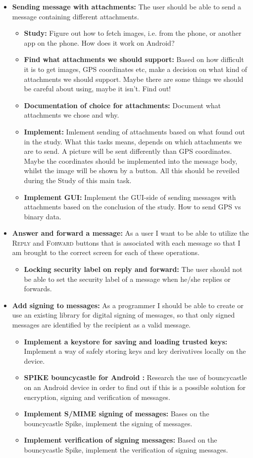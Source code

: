 \begin{itemize}
\item{}\textbf{Sending message with attachments:} The user should be able to send a message containing different attachments.
\begin{itemize}
\item{}\textbf{Study:} Figure out how to fetch images, i.e. from the phone, or another app on the phone. How does it work on Android?
\item{}\textbf{Find what attachments we should support:} Based on how difficult it is to get images, GPS coordinates etc, make a decision on what kind of attachments we should support. Maybe there are some things we should be careful about using, maybe it isn't. Find out!
\item{}\textbf{Documentation of choice for attachments:} Document what attachments we chose and why.
\item{}\textbf{Implement:} Imlement sending of attachments based on what found out in the study. What this tasks means, depends on which attachments we are to send. A picture will be sent differently than GPS coordinates. Maybe the coordinates should be implemented into the message body, whilst the image will be shown by a button. All this should be reveiled during the Study of this main task. 
\item{}\textbf{Implement GUI:} Implement the GUI-side of sending messages with attachments based on the conclusion of the study. How to send GPS vs binary data.
\end{itemize}
\item{}\textbf{Answer and forward a message:} As a user I want to be able to utilize the \textsc{Reply} and \textsc{Forward} buttons that is associated with each message so that I am brought to the correct screen for each of these operations.
\begin{itemize}
\item{}\textbf{Locking security label on reply and forward:} The user should not be able to set the security label of a message when he/she replies or forwards.
\end{itemize}
\item{}\textbf{Add signing to messages:} As a programmer I should be able to create or use an existing library for digital signing of messages, so that only signed messages are identified by the recipient as a valid message.
\begin{itemize}
\item{}\textbf{Implement a keystore for saving and loading trusted keys:} Implement a way of safely storing keys and key derivatives locally on the device. 
\item{}\textbf{SPIKE bouncycastle for Android :} Research the use of bouncycastle on an Android device in order to find out if this is a possible solution for encryption, signing and verification of messages.
\item{}\textbf{Implement S/MIME signing of messages:} Bases on the bouncycastle Spike, implement the signing of messages. 
\item{}\textbf{Implement verification of signing messages:} Based on the bouncycastle Spike, implement the verification of signing messages.
\end{itemize}


\end{itemize}
